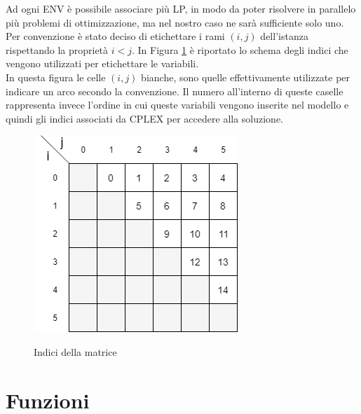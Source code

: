 Ad ogni ENV è possibile associare più LP, in modo da poter risolvere in parallelo più problemi di ottimizzazione, ma nel nostro caso ne sarà sufficiente solo uno.\\
Per convenzione è stato deciso di etichettare i rami $(i,j)$ dell'istanza rispettando la proprietà $i<j$. In Figura \ref{Indici_matrice} è riportato lo schema degli indici che vengono utilizzati per etichettare le variabili.\\
In questa figura le celle $(i,j)$ bianche, sono quelle effettivamente utilizzate per indicare un arco secondo la convenzione. Il numero all'interno di queste caselle rappresenta invece l'ordine in cui queste variabili vengono inserite nel modello e quindi gli indici associati da CPLEX per accedere alla soluzione.\\
\begin{figure}[h] 
\begin{center} 
  \includegraphics[scale=0.6]{Images/indices_matrix}\\ 
  \caption{\footnotesize{Indici della matrice}}
  \label{Indici_matrice} 
\end{center} 
\end{figure}

\section{Funzioni}

